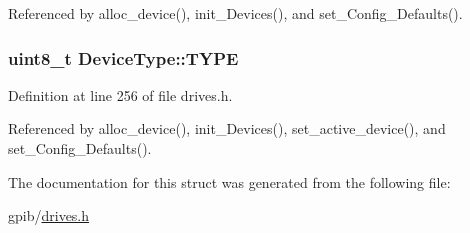 Referenced by alloc\+\_\+device(), init\+\_\+\+Devices(), and set\+\_\+\+Config\+\_\+\+Defaults().

\subsubsection[{\texorpdfstring{T\+Y\+PE}{TYPE}}]{\setlength{\rightskip}{0pt plus 5cm}uint8\+\_\+t Device\+Type\+::\+T\+Y\+PE}\hypertarget{structDeviceType_acee5219162b6f47a9423b2086d127ede}{}\label{structDeviceType_acee5219162b6f47a9423b2086d127ede}


Definition at line 256 of file drives.\+h.



Referenced by alloc\+\_\+device(), init\+\_\+\+Devices(), set\+\_\+active\+\_\+device(), and set\+\_\+\+Config\+\_\+\+Defaults().



The documentation for this struct was generated from the following file\+:\begin{DoxyCompactItemize}
\item 
gpib/\hyperlink{drives_8h}{drives.\+h}\end{DoxyCompactItemize}
